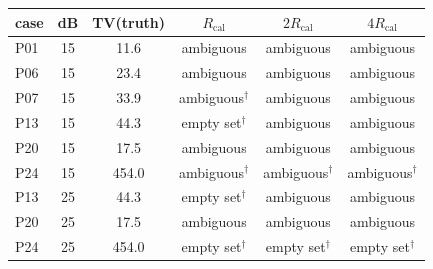 \begin{tabular}{@{}lcc ccc@{}}\toprule
case & dB & TV(truth) & $R_{\mathrm{cal}}$ & $2R_{\mathrm{cal}}$ & $4R_{\mathrm{cal}}$\\\midrule
P01 & 15 & 11.6 & ambiguous & ambiguous & ambiguous\\
P06 & 15 & 23.4 & ambiguous & ambiguous & ambiguous\\
P07 & 15 & 33.9 & ambiguous$^\dagger$ & ambiguous & ambiguous\\
P13 & 15 & 44.3 & empty set$^\dagger$ & ambiguous & ambiguous\\
P20 & 15 & 17.5 & ambiguous & ambiguous & ambiguous\\
P24 & 15 & 454.0 & ambiguous$^\dagger$ & ambiguous$^\dagger$ & ambiguous$^\dagger$\\
P13 & 25 & 44.3 & empty set$^\dagger$ & ambiguous & ambiguous\\
P20 & 25 & 17.5 & ambiguous & ambiguous & ambiguous\\
P24 & 25 & 454.0 & empty set$^\dagger$ & empty set$^\dagger$ & empty set$^\dagger$\\
\bottomrule\end{tabular}
